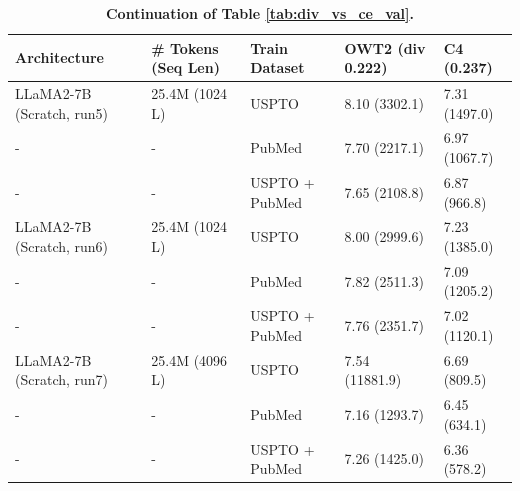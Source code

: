\begin{table}[h]
\caption{\textbf{Continuation of Table \ref{tab:div_vs_ce_val}.}}
\vspace{10pt}
\centering
\begin{tabularx}{1\textwidth}{lXXXX} 
\bottomrule 
Architecture & \# Tokens (Seq Len) & Train Dataset  & OWT2 (\textbf{div 0.222})  & C4 (\textbf{0.237}) \\
\bottomrule 
LLaMA2-7B (Scratch, run5) & 25.4M (1024 L) & USPTO  & 8.10 (3302.1) & 7.31 (1497.0) \\ %
- & - & PubMed & 7.70 (2217.1) & 6.97 (1067.7) \\ %
- & - & USPTO + PubMed & 7.65 (2108.8) & 6.87 (966.8) \\ %
\hline
LLaMA2-7B (Scratch, run6) & 25.4M  (1024 L) & USPTO  & 8.00 (2999.6) & 7.23 (1385.0) \\ %
- & - & PubMed & 7.82 (2511.3) & 7.09 (1205.2) \\ %
- & - & USPTO + PubMed & 7.76 (2351.7) & 7.02 (1120.1) \\ %
\hline

LLaMA2-7B (Scratch, run7) & 25.4M (4096 L) & USPTO  & 7.54 (11881.9) & 6.69 (809.5) \\ %
- & - & PubMed & 7.16 (1293.7) & 6.45 (634.1) \\ %
- & - & USPTO + PubMed & 7.26 (1425.0) & 6.36 (578.2) \\ %
\hline



\end{tabularx}
\end{table}
